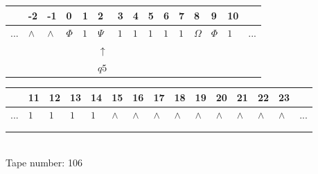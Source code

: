 \documentclass[11pt]{article}
\begin{document}
\begin{table}[H]
\centering
\begin{tabular}{lllllllllllllll}
 & -2 & -1 & 0 & 1 & 2 & 3 & 4 & 5 & 6 & 7 & 8 & 9 & 10 & \\
\hline
$...$ & \multicolumn{1}{|l|}{$\wedge$} & \multicolumn{1}{|l|}{$\wedge$} & \multicolumn{1}{|l|}{$\Phi$} & \multicolumn{1}{|l|}{$1$} & \multicolumn{1}{|l|}{$\Psi$} & \multicolumn{1}{|l|}{$1$} & \multicolumn{1}{|l|}{$1$} & \multicolumn{1}{|l|}{$1$} & \multicolumn{1}{|l|}{$1$} & \multicolumn{1}{|l|}{$1$} & \multicolumn{1}{|l|}{$\Omega$} & \multicolumn{1}{|l|}{$\Phi$} & \multicolumn{1}{|l|}{$1$} & $...$\\
\hline
&  &  &  &  & $\uparrow$ &  &  &  &  &  &  &  &  &  \\
&  &  &  &  & $ q5 $ &  &  &  &  &  &  &  &  &  \\
\end{tabular}
\begin{tabular}{lllllllllllllll}
 & 11 & 12 & 13 & 14 & 15 & 16 & 17 & 18 & 19 & 20 & 21 & 22 & 23 & \\
\hline
$...$ & \multicolumn{1}{|l|}{$1$} & \multicolumn{1}{|l|}{$1$} & \multicolumn{1}{|l|}{$1$} & \multicolumn{1}{|l|}{$1$} & \multicolumn{1}{|l|}{$\wedge$} & \multicolumn{1}{|l|}{$\wedge$} & \multicolumn{1}{|l|}{$\wedge$} & \multicolumn{1}{|l|}{$\wedge$} & \multicolumn{1}{|l|}{$\wedge$} & \multicolumn{1}{|l|}{$\wedge$} & \multicolumn{1}{|l|}{$\wedge$} & \multicolumn{1}{|l|}{$\wedge$} & \multicolumn{1}{|l|}{$\wedge$} & $...$\\
\hline
&  &  &  &  &  &  &  &  &  &  &  &  &  &  \\
&  &  &  &  &  &  &  &  &  &  &  &  &  &  \\
\end{tabular}
\\
Tape number: 106
\noindent\makebox[\linewidth]{\hdashrule{\textwidth}{1pt}{1pt}}\end{table}
\end{document}
